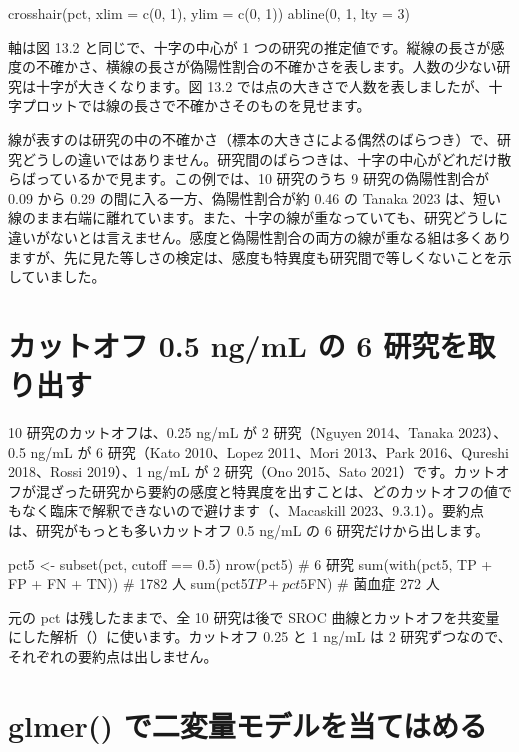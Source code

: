 \begin{rcode}
crosshair(pct, xlim = c(0, 1), ylim = c(0, 1))
abline(0, 1, lty = 3)
\end{rcode}

軸は図 13.2 と同じで、十字の中心が 1 つの研究の推定値です。縦線の長さが感度の不確かさ、横線の長さが偽陽性割合の不確かさを表します。人数の少ない研究は十字が大きくなります。図 13.2 では点の大きさで人数を表しましたが、十字プロットでは線の長さで不確かさそのものを見せます。

線が表すのは研究の中の不確かさ（標本の大きさによる偶然のばらつき）で、研究どうしの違いではありません。研究間のばらつきは、十字の中心がどれだけ散らばっているかで見ます。この例では、10 研究のうち 9 研究の偽陽性割合が 0.09 から 0.29 の間に入る一方、偽陽性割合が約 0.46 の Tanaka 2023 は、短い線のまま右端に離れています。また、十字の線が重なっていても、研究どうしに違いがないとは言えません。感度と偽陽性割合の両方の線が重なる組は多くありますが、先に見た等しさの検定は、感度も特異度も研究間で等しくないことを示していました。

\section{カットオフ 0.5 ng/mL の 6 研究を取り出す}
\label{sec:13-2}

10 研究のカットオフは、0.25 ng/mL が 2 研究（Nguyen 2014、Tanaka 2023）、0.5 ng/mL が 6 研究（Kato 2010、Lopez 2011、Mori 2013、Park 2016、Qureshi 2018、Rossi 2019）、1 ng/mL が 2 研究（Ono 2015、Sato 2021）です。カットオフが混ざった研究から要約の感度と特異度を出すことは、どのカットオフの値でもなく臨床で解釈できないので避けます（、Macaskill 2023、9.3.1）。要約点は、研究がもっとも多いカットオフ 0.5 ng/mL の 6 研究だけから出します。

\begin{rcode}
pct5 <- subset(pct, cutoff == 0.5)
nrow(pct5)                                   # 6 研究
sum(with(pct5, TP + FP + FN + TN))           # 1782 人
sum(pct5$TP + pct5$FN)                       # 菌血症 272 人
\end{rcode}

元の pct は残したままで、全 10 研究は後で SROC 曲線とカットオフを共変量にした解析（）に使います。カットオフ 0.25 と 1 ng/mL は 2 研究ずつなので、それぞれの要約点は出しません。

\section{glmer() で二変量モデルを当てはめる}
\label{sec:13-3}

